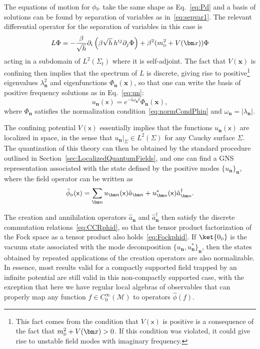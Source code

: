 \documentclass[letterpaper,12pt,titlepage,oneside,final]{book}
\newcommand{\M}{\mathcal{M}}
\newcommand{\mf}{\mathsf}%
\newcommand{\ii}{\mathrm{i}}
\newcommand{\tc}[1]{\textsc{#1}}
\begin{document}
The equations of motion for $\phi_\tc{d}$ take the same shape as Eq.~\eqref{eq:Pd} and a basis of solutions can be found by separation of variables as in~\eqref{eq:sepvar1}. The relevant differential operator for the separation of variables in this case is
\begin{equation}
    L \Phi = -\frac{\beta}{\sqrt{h}}\partial_i\left(\beta \sqrt{h}\, h^{ij} \partial_j \Phi\right) + \beta^2 (m_\tc{d}^2 + V(\bm x))\Phi
\end{equation}
acting in a subdomain of $L^2(\Sigma_t)$ where it is self-adjoint. The fact that $V(\bm x)$ is confining then implies that the spectrum of $L$ is discrete, giving rise to positive\footnote{This fact comes from the condition that $V(\mf x)$ is positive is a consequence of the fact that $m_\tc{d}^2 + V(\bm x)>0$. If this condition was violated, it could give rise to unstable field modes with imaginary frequency.} eigenvalues $\lambda_{\bm n}^2$ and eigenfunctions $\Phi_{\bm n}(\bm x)$, so that one can write the basis of positive frequency solutions as in Eq.~\eqref{eq:un}:
\begin{equation}
    u_{\bm n}(\mf x) = e^{- \ii \omega_{\bm n}t} \Phi_{\bm n}(\bm x), 
\end{equation}
where $\Phi_{\bm n}$ satisfies the normalization condition~\eqref{eq:normCondPhin} and $\omega_{\bm n} = |\lambda_{\bm n}|$.

The confining potential $V(\mf x)$ essentially implies that the functions $u_{\bm n}(\mf x)$ are localized in space, in the sense that $u_{\bm n}|_\Sigma \in L^2(\Sigma)$ for any Cauchy surface $\Sigma$. The quantization of this theory can then be obtained by the standard procedure outlined in Section~\ref{sec:LocalizedQuantumFields}, and one can find a GNS representation associated with the state defined by the positive modes $\{u_{\bm n}\}_{\bm n}$, where the field operator can be written as
\begin{equation}\label{eq:phidexp}
    \hat{\phi}_\tc{d}(\mf x) = \sum_{\bm n} u_{\bm n}(\mf x) \hat{a}_{\bm n} + u_{\bm n}^*(\mf x) \hat{a}_{\bm n}^\dagger.
\end{equation}

The creation and annihilation operators $\hat{a}_{\bm n}$ and $\hat{a}_{\bm n}^\dagger$ then satisfy the discrete commutation relations~\eqref{eq:CCRphid}, so that the tensor product factorization of the Fock space as a tensor product also holds~\eqref{eq:Fockphid}. If $\ket{0_\tc{d}}$ is the vacuum state associated with the mode decomposition $\{u_{\bm n},u_{\bm n}^*\}_{\bm n}$, then the states obtained by repeated applications of the creation operators are also normalizable. In essence, most results valid for a compactly supported field trapped by an infinite potential are still valid in this non-compactly supported case, with the exception that here we have regular local algebras of observables that can properly map any function $f\in C_0^\infty(\M)$ to operators $\hat{\phi}(f)$. 
\end{document}
